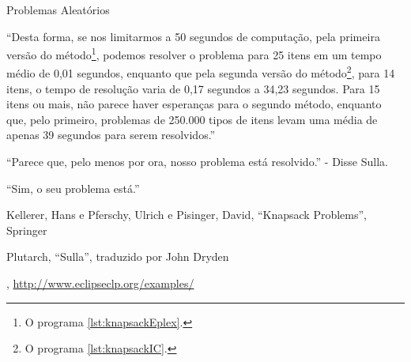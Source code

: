 \documentclass{article}
\begin{document}
  \begin{listing}[H]
    \inputminted{prolog}{../Exemplos/Cap12/test/random.ecl}
    \caption{Problemas Aleatórios}\label{lst:random}
  \end{listing}

  ``Desta forma, se nos limitarmos a 50 segundos de computação, pela primeira versão do
  método\footnote{O programa \ref{lst:knapsackEplex}.}, podemos resolver o problema para 25 itens em
  um tempo médio de 0,01 segundos, enquanto que pela segunda versão do método\footnote{O programa
    \ref{lst:knapsackIC}.}, para 14 itens,  o tempo de resolução varia de 0,17 segundos a 34,23 segundos. Para 15 itens ou mais, não parece haver esperanças para o segundo método, enquanto que, pelo primeiro, problemas de 250.000 tipos de itens levam uma média de apenas 39 segundos para serem resolvidos.''

  ``Parece que, pelo menos por ora, nosso problema está resolvido.'' - Disse Sulla.

  ``Sim, o seu problema está.''











  \begin{thebibliography}{2}

    Kellerer, Hans e Pferschy, Ulrich e Pisinger, David,
    ``Knapsack Problems'', Springer

    Plutarch,
    ``Sulla'', traduzido por John Dryden

    \eclipse,
    \url{http://www.eclipseclp.org/examples/}

  \end{thebibliography}
\end{document}
